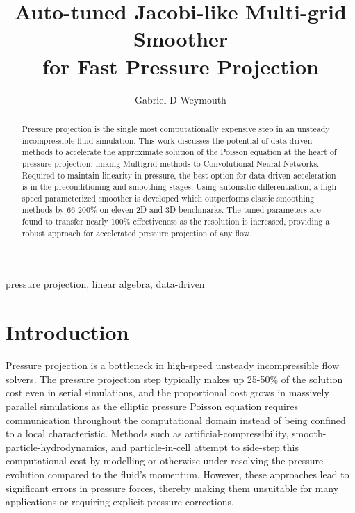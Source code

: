 \documentclass[review]{elsarticle}
\begin{document}
\begin{frontmatter}

\title{Auto-tuned Jacobi-like Multi-grid Smoother\\ for Fast Pressure Projection}

\author{Gabriel D Weymouth}
\address{Engineering and Physical Sciences, University of Southampton, Southampton, UK}
\address{Data-Centric Engineering, Alan Turing Institute, London, UK}

\begin{abstract}
Pressure projection is the single most computationally expensive step in an unsteady incompressible fluid simulation. This work discusses the potential of data-driven methods to accelerate the approximate solution of the Poisson equation at the heart of pressure projection, linking Multigrid methods to Convolutional Neural Networks. Required to maintain linearity in pressure, the best option for data-driven acceleration is in the preconditioning and smoothing stages. Using automatic differentiation, a high-speed parameterized smoother is developed which outperforms classic smoothing methods by 66-200\% on eleven 2D and 3D benchmarks. The tuned parameters are found to transfer nearly 100\% effectiveness as the resolution is increased, providing a robust approach for accelerated pressure projection of any flow.
\end{abstract}

\begin{keyword}
pressure projection, linear algebra, data-driven
\end{keyword}

\end{frontmatter}

\section{Introduction}

Pressure projection is a bottleneck in high-speed unsteady incompressible flow solvers. The pressure projection step typically makes up 25-50\% of the solution cost even in serial simulations, and the proportional cost grows in massively parallel simulations as the elliptic pressure Poisson equation requires communication throughout the computational domain instead of being confined to a local characteristic. Methods such as artificial-compressibility, smooth-particle-hydrodynamics, and particle-in-cell attempt to side-step this computational cost by modelling or otherwise under-resolving the pressure evolution compared to the fluid's momentum. However, these approaches lead to significant errors in pressure forces, thereby making them unsuitable for many applications or requiring explicit pressure corrections.
\end{document}

